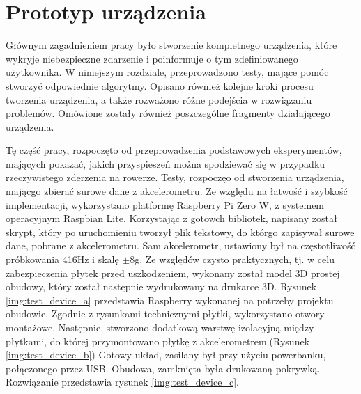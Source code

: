 \chapter{Prototyp urządzenia}
\label{cha:prototyp}

Głównym zagadnieniem pracy było stworzenie kompletnego urządzenia, które wykryje niebezpieczne zdarzenie i poinformuje o tym zdefiniowanego użytkownika. W niniejszym rozdziale, przeprowadzono testy, mające pomóc stworzyć odpowiednie algorytmy. Opisano również kolejne kroki procesu tworzenia urządzenia, a także rozważono różne podejścia w rozwiązaniu problemów. Omówione zostały również poszczególne fragmenty działającego urządzenia.

Tę część pracy, rozpoczęto od przeprowadzenia podstawowych eksperymentów, mających pokazać, jakich przyspieszeń można spodziewać się w przypadku rzeczywistego zderzenia na rowerze. Testy, rozpoczęo od stworzenia urządzenia, mającgo zbierać surowe dane z akcelerometru. Ze względu na łatwość i szybkość implementacji, wykorzystano platformę Raspberry Pi Zero W, z systemem operacyjnym Raspbian Lite. Korzystając z gotowch bibliotek, napisany został skrypt, który po uruchomieniu tworzył plik tekstowy, do którgo zapisywał surowe dane, pobrane z akcelerometru. Sam akcelerometr, ustawiony był na częstotliwość próbkowania 416Hz i skalę $\pm$8g. 
\newline
Ze względów czysto praktycznych, tj. w celu zabezpieczenia płytek przed uszkodzeniem, wykonany został model 3D prostej obudowy, który został następnie wydrukowany na drukarce 3D. Rysunek \ref{img:test_device_a} przedstawia Raspberry wykonanej na potrzeby projektu obudowie. Zgodnie z rysunkami technicznymi płytki, wykorzystano otwory montażowe. Następnie, stworzono dodatkową warstwę izolacyjną między płytkami, do której przymontowano płytkę z akcelerometrem.(Rysunek \ref{img:test_device_b}) Gotowy układ, zasilany był przy użyciu powerbanku, połączonego przez USB. Obudowa, zamknięta była drukowaną pokrywką. Rozwiązanie przedstawia rysunek \ref{img:test_device_c}.
\newline


